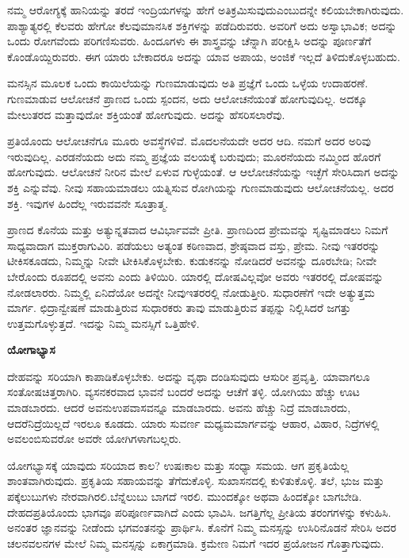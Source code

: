 ನಮ್ಮ ಆರೋಗ್ಯಕ್ಕೆ ಹಾನಿಯನ್ನು ತರದೆ ಇಂದ್ರಿಯಗಳನ್ನು ಹೇಗೆ ಅತಿಕ್ರಮಿಸುವುದು\break ಎಂಬುದನ್ನೇ ಕಲಿಯಬೇಕಾಗಿರುವುದು. ಪಾಶ್ಯಾತ್ಯರಲ್ಲಿ ಕೆಲವರು ಹೇಗೋ ಕೆಲವು\break ಮಾನಸಿಕ ಶಕ್ತಿಗಳನ್ನು ಪಡೆದಿರುವರು. ಅವರಿಗೆ ಅದು ಅಸ್ವಾಭಾವಿಕ; ಅದನ್ನು ಒಂದು ರೋಗವೆಂದು ಪರಿಗಣಿಸುವರು. ಹಿಂದೂಗಳು ಈ ಶಾಸ್ತ್ರವನ್ನು ಚೆನ್ನಾಗಿ ಪರೀಕ್ಷಿಸಿ ಅದನ್ನು ಪೂರ್ಣತೆಗೆ ಕೊಂಡೊಯ್ದಿರುವರು. ಈಗ ಯಾರು ಬೇಕಾದರೂ ಅದನ್ನು ಯಾವ ಅಪಾಯ, ಅಂಜಿಕೆ ಇಲ್ಲದೆ ತಿಳಿದುಕೊಳ್ಳಬಹುದು.

ಮನಸ್ಸಿನ ಮೂಲಕ ಒಂದು ಕಾಯಿಲೆಯನ್ನು ಗುಣಮಾಡುವುದು ಅತಿ ಪ್ರಜ್ಞೆಗೆ ಒಂದು ಒಳ್ಳೆಯ ಉದಾಹರಣೆ. ಗುಣಮಾಡುವ ಆಲೋಚನೆ ಪ್ರಾಣದ ಒಂದು ಸ್ಪಂದನ, ಅದು ಆಲೋಚನೆಯಂತೆ ಹೋಗುವುದಿಲ್ಲ. ಅದಕ್ಕೂ ಮೇಲುತರದ ಮತ್ತಾವುದೋ ಶಕ್ತಿಯಂತೆ ಹೋಗುವುದು. ಅದನ್ನು ಹೆಸರಿಸಲಾರೆವು.

ಪ್ರತಿಯೊಂದು ಆಲೋಚನೆಗೂ ಮೂರು ಅವಸ್ಥೆಗಳಿವೆ. ಮೊದಲನೆಯದೇ ಅದರ ಆದಿ. ನಮಗೆ ಅದರ ಅರಿವು ಇರುವುದಿಲ್ಲ. ಎರಡನೆಯದು ಅದು ನಮ್ಮ ಪ್ರಜ್ಞೆಯ ವಲಯಕ್ಕೆ ಬರುವುದು; ಮೂರನೆಯದು ನಮ್ಮಿಂದ ಹೊರಗೆ ಹೋಗುವುದು. ಆಲೋಚನೆ ನೀರಿನ ಮೇಲೆ ಏಳುವ ಗುಳ್ಳೆಯಂತೆ. ಆ ಆಲೋಚನೆಯನ್ನು ಇಚ್ಛೆಗೆ ಸೇರಿಸಿದಾಗ ಅದನ್ನು ಶಕ್ತಿ ಎನ್ನುವೆವು. ನೀವು ಸಹಾಯಮಾಡಲು ಯತ್ನಿಸುವ ರೋಗಿಯನ್ನು ಗುಣಮಾಡುವುದು ಆಲೋಚನೆಯಲ್ಲ. ಅದರ ಶಕ್ತಿ. ಇವುಗಳ ಹಿಂದೆಲ್ಲ ಇರುವವನೇ ಸೂತ್ರಾತ್ಮ.

ಪ್ರಾಣದ ಕೊನೆಯ ಮತ್ತು ಅತ್ಯುನ್ನತವಾದ ಆವಿರ್ಭಾವವೇ ಪ್ರೀತಿ. ಪ್ರಾಣದಿಂದ ಪ್ರೇಮವನ್ನು ಸೃಷ್ಟಿಮಾಡಲು ನಿಮಗೆ ಸಾಧ್ಯವಾದಾಗ ಮುಕ್ತರಾಗುವಿರಿ. ಪಡೆಯಲು ಅತ್ಯಂತ ಕಠಿಣವಾದ, ಶ್ರೇಷ್ಠವಾದ ವಸ್ತು, ಪ್ರೇಮ. ನೀವು ಇತರರನ್ನು ಟೀಕಿಸಕೂಡದು, ನಿಮ್ಮನ್ನು ನೀವೇ ಟೀಕಿಸಿಕೊಳ್ಳಬೇಕು. ಕುಡುಕನನ್ನು ನೋಡಿದರೆ ಅವನನ್ನು ದೂರಬೇಡಿ; ನೀವೇ ಬೇರೊಂದು ರೂಪದಲ್ಲಿ ಅವನು ಎಂದು ತಿಳಿಯಿರಿ. ಯಾರಲ್ಲಿ ದೋಷವಿಲ್ಲವೋ ಅವರು ಇತರರಲ್ಲಿ ದೋಷವನ್ನು ನೋಡಲಾರರು. ನಿಮ್ಮಲ್ಲಿ ಏನಿದೆಯೋ ಅದನ್ನೇ ನೀವು\break ಇತರರಲ್ಲಿ ನೋಡುತ್ತೀರಿ. ಸುಧಾರಣೆಗೆ ಇದೇ ಅತ್ಯುತ್ತಮ ಮಾರ್ಗ. ಛಿದ್ರಾನ್ವೇಷಣೆ ಮಾಡುತ್ತಿರುವ ಸುಧಾರಕರು ತಾವು ಮಾಡುತ್ತಿರುವ ತಪ್ಪನ್ನು ನಿಲ್ಲಿಸಿದರೆ ಜಗತ್ತು ಉತ್ತಮ\-ಗೊಳ್ಳುತ್ತದೆ. ಇದನ್ನು ನಿಮ್ಮ ಮನಸ್ಸಿಗೆ ಒತ್ತಿಹೇಳಿ.

\quad\qquad\qquad\qquad\qquad\textbf{ಯೋಗಾಭ್ಯಾಸ}

ದೇಹವನ್ನು ಸರಿಯಾಗಿ ಕಾಪಾಡಿಕೊಳ್ಳಬೇಕು. ಅದನ್ನು ವೃಥಾ ದಂಡಿಸುವುದು ಆಸುರೀ ಪ್ರವೃತ್ತಿ. ಯಾವಾಗಲೂ ಸಂತೋಷಚಿತ್ತರಾಗಿರಿ. ವ್ಯಸನಕರವಾದ ಭಾವನೆ ಬಂದರೆ ಅದನ್ನು ಆಚೆಗೆ ತಳ್ಳಿ. ಯೋಗಿಯು ಹೆಚ್ಚು ಊಟ ಮಾಡಬಾರದು. ಆದರೆ ಅವನು\break ಉಪವಾಸವನ್ನೂ ಮಾಡಬಾರದು. ಅವನು ಹೆಚ್ಚು ನಿದ್ರೆ ಮಾಡಬಾರದು, ಆದರೆ\break ನಿದ್ರೆಯಿಲ್ಲದೆ ಇರಲೂ ಕೂಡದು. ಯಾರು ಸುವರ್ಣ ಮಧ್ಯಮಮಾರ್ಗವನ್ನು ಆಹಾರ, ವಿಹಾರ, ನಿದ್ರೆಗಳಲ್ಲಿ ಅವಲಂಬಿಸುವರೋ ಅವರೇ ಯೋಗಿಗಳಾಗಬಲ್ಲರು.

ಯೋಗಭ್ಯಾಸಕ್ಕೆ ಯಾವುದು ಸರಿಯಾದ ಕಾಲ? ಉಷಃಕಾಲ ಮತ್ತು ಸಂಧ್ಯಾ ಸಮಯ. ಆಗ ಪ್ರಕೃತಿಯೆಲ್ಲ ಶಾಂತವಾಗಿರುವುದು. ಪ್ರಕೃತಿಯ ಸಹಾಯವನ್ನು ತೆಗೆದುಕೊಳ್ಳಿ. ಸುಖಾಸನದಲ್ಲಿ ಕುಳಿತುಕೊಳ್ಳಿ. ತಲೆ, ಭುಜ ಮತ್ತು ಪಕ್ಕೆಲುಬುಗಳು ನೇರವಾಗಿರಲಿ.\break ಬೆನ್ನೆಲುಬು ಬಾಗದೆ ಇರಲಿ. ಮುಂದಕ್ಕೋ ಅಥವಾ ಹಿಂದಕ್ಕೋ ಬಾಗಬೇಡಿ. ದೇಹದ\break ಪ್ರತಿಯೊಂದು ಭಾಗವೂ ಪರಿಪೂರ್ಣವಾಗಿದೆ ಎಂದು ಭಾವಿಸಿ. ಜಗತ್ತಿಗೆಲ್ಲ ಪ್ರೀತಿಯ ತರಂಗಗಳನ್ನು ಕಳುಹಿಸಿ. ಅನಂತರ ಜ್ಞಾನವನ್ನು ನೀಡೆಂದು ಭಗವಂತನನ್ನು ಪ್ರಾರ್ಥಿಸಿ. ಕೊನೆಗೆ ನಿಮ್ಮ ಮನಸ್ಸನ್ನು ಉಸಿರಿನೊಡನೆ ಸೇರಿಸಿ ಅದರ ಚಲನವಲನಗಳ ಮೇಲೆ ನಿಮ್ಮ ಮನಸ್ಸನ್ನು ಏಕಾಗ್ರಮಾಡಿ. ಕ್ರಮೇಣ ನಿಮಗೆ ಇದರ ಪ್ರಯೋಜನ ಗೊತ್ತಾಗುವುದು.


